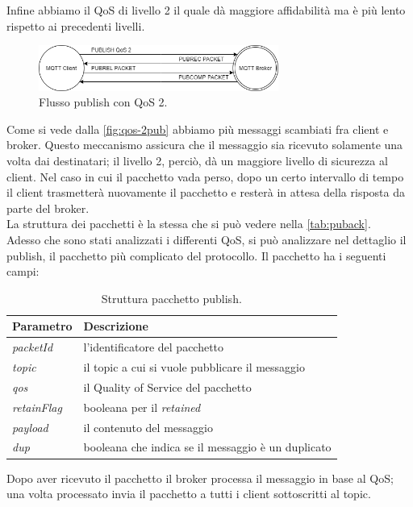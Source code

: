 \documentclass[binding=0.6cm,TFA]{sapthesis}
\begin{document}
\begin{large}
Infine abbiamo il QoS di livello 2 il quale dà maggiore affidabilità ma è più lento rispetto ai precedenti livelli.

\begin{figure}[h]
\centering
\includegraphics[width=0.7\textwidth]{images/publish-qos2.png}
\caption{Flusso publish con QoS 2.}
\label{fig:qos-2pub}
\end{figure}

Come si vede dalla \autoref{fig:qos-2pub} abbiamo più messaggi scambiati fra client e broker. Questo meccanismo assicura che il messaggio sia ricevuto solamente una volta dai destinatari; il livello 2, perciò, dà un maggiore livello di sicurezza al client.
Nel caso in cui il pacchetto vada perso, dopo un certo intervallo di tempo il client trasmetterà nuovamente il pacchetto e resterà in attesa della risposta da parte del broker. \\
La struttura dei pacchetti è la stessa che si può vedere nella \autoref{tab:puback}. \\

Adesso che sono stati analizzati i differenti QoS, si può analizzare nel dettaglio il publish, il pacchetto più complicato del protocollo.
Il pacchetto ha i seguenti campi:
\begin{table}[h]
\caption{Struttura pacchetto publish.}
\label{tab:publish}
\begin{tabular}{lp{}}
\toprule
\textbf{Parametro} & \textbf{Descrizione} \\
\midrule
\textit{packetId} & l'identificatore del pacchetto \\
\textit{topic} & il topic a cui si vuole pubblicare il messaggio \\
\textit{qos} & il Quality of Service del pacchetto \\
\textit{retainFlag} & booleana per il \textit{retained} \\
\textit{payload} & il contenuto del messaggio \\
\textit{dup} & booleana che indica se il messaggio è un duplicato \\
\bottomrule
\end{tabular}
\end{table}

Dopo aver ricevuto il pacchetto il broker processa il messaggio in base al QoS; una volta processato invia il pacchetto a tutti i client sottoscritti al topic.


\end{large}
\end{document}
